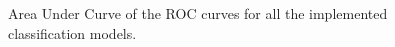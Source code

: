 \documentclass{article} %
\begin{document}
		\begin{figure}[h]
			\begin{center}
			\end{center}
			\caption{Area Under Curve of the ROC curves for all the implemented classification models.}
			\label{fig:Plot2}
		\end{figure} 
		
\end{document}
